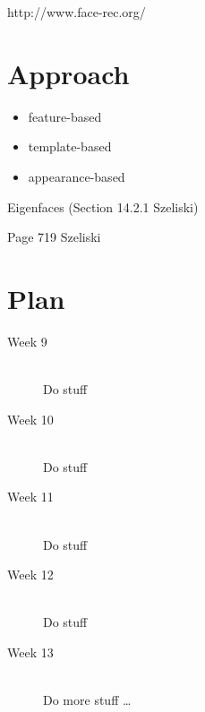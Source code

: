 \documentclass[11pt]{article} %
\theoremstyle{plain}
\theoremstyle{definition}
\theoremstyle{remark}
\numberwithin{equation}{section} %
\numberwithin{figure}{section} %
\numberwithin{table}{section} %
\begin{document}
http://www.face-rec.org/

\section{Approach}


\begin{itemize}
  \item feature-based
  \item template-based
  \item appearance-based
\end{itemize}

Eigenfaces (Section 14.2.1 Szeliski)


Page 719 Szeliski

\section{Plan}


\begin{description}
  \item[Week 9] \hfill \\
  Do stuff
  \item[Week 10] \hfill \\
  Do stuff
  \item[Week 11] \hfill \\
  Do stuff
  \item[Week 12] \hfill \\
  Do stuff
  \item[Week 13] \hfill \\
  Do more stuff \ldots
\end{description}



\end{document}
